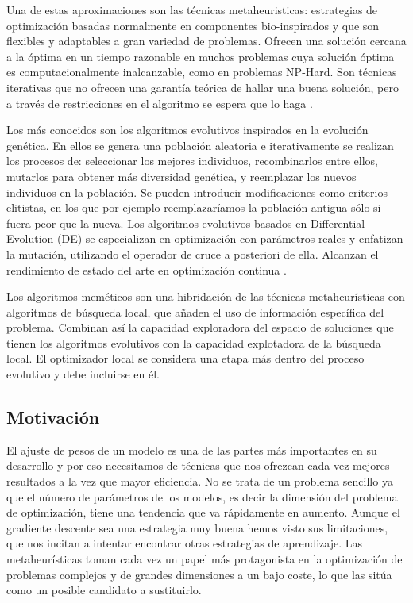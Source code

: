 Una de estas aproximaciones son las técnicas metaheuristicas: estrategias de optimización basadas normalmente en componentes bio-inspirados y que son flexibles y adaptables a gran variedad de problemas. Ofrecen una solución cercana a la óptima en un tiempo razonable en muchos problemas cuya solución óptima es computacionalmente inalcanzable, como en problemas NP-Hard. Son técnicas iterativas que no ofrecen una garantía teórica de hallar una buena solución, pero a través de restricciones en el algoritmo se espera que lo haga \cite{MHtrainingClase}.

Los más conocidos son los algoritmos evolutivos inspirados en la evolución genética. En ellos se genera una población aleatoria e iterativamente se realizan los procesos de: seleccionar los mejores individuos, recombinarlos entre ellos, mutarlos para obtener más diversidad genética, y reemplazar los nuevos individuos en la población. Se pueden introducir modificaciones como criterios elitistas, en los que por ejemplo reemplazaríamos la población antigua sólo si fuera peor que la nueva. Los algoritmos evolutivos basados en Differential Evolution (DE) se especializan en optimización con parámetros reales y enfatizan la mutación, utilizando el operador de cruce a posteriori de ella. Alcanzan el rendimiento de estado del arte en optimización continua \cite{MHoverview}.

Los algoritmos meméticos son una hibridación de las técnicas metaheurísticas con algoritmos de búsqueda local, que añaden el uso de información específica del problema. Combinan así la capacidad exploradora del espacio de soluciones que tienen los algoritmos evolutivos con la capacidad explotadora de la búsqueda local. El optimizador local se considera una etapa más dentro del proceso evolutivo y debe incluirse en él.



\subsection{Motivación}

El ajuste de pesos de un modelo es una de las partes más importantes en su desarrollo y por eso necesitamos de técnicas que nos ofrezcan cada vez mejores resultados a la vez que mayor eficiencia. No se trata de un problema sencillo ya que el número de parámetros de los modelos, es decir la dimensión del problema de optimización, tiene una tendencia que va rápidamente en aumento. Aunque el gradiente descente sea una estrategia muy buena hemos visto sus limitaciones, que nos incitan a intentar encontrar otras estrategias de aprendizaje. Las metaheurísticas toman cada vez un papel más protagonista en la optimización de problemas complejos y de grandes dimensiones a un bajo coste, lo que las sitúa como un posible candidato a sustituirlo.

